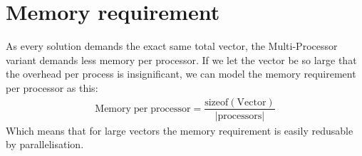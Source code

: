 \section{Memory requirement}
As every solution demands the exact same total vector, the Multi-Processor variant demands less memory per processor. If we let the vector be so large that the overhead per process is insignificant, we can model the memory requirement per processor as this: 
\begin{align*}
\mathrm{Memory\; per\; processor} =\dfrac{\mathrm{sizeof}\left(\mathrm{Vector}\right)}{|\mathrm{processors}|}
\end{align*}
Which means that for large vectors the memory requirement is easily redusable by parallelisation. 
